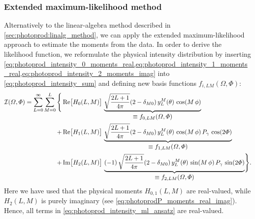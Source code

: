 \subsubsection{Extended maximum-likelihood method}%
\label{sec:photoprod:maximum_likelihood_method}

Alternatively to the linear-algebra method described in
\cref{sec:photoprod:linalg_method}, we can apply the extended
maximum-likelihood approach to estimate the moments from the data.  In
order to derive the likelihood function, we reformulate the physical
intensity distribution by inserting
\cref{eq:photoprod_intensity_0_moments_real,eq:photoprod_intensity_1_moments_real,eq:photoprod_intensity_2_moments_imag}
into \cref{eq:photoprod_intensity_sum} and defining new basis functions $f_{i, L M}(\Omega, \Phi)$:
\begin{align}
  \intensity(\Omega, \Phi)
  = \sum_{L = 0}^\infty \sum_{M = 0}^{L} \Bigg\{%
         &\Re[1]{H_0(L, M)}\, \dUnderbrace{       \sqrt{\frac{2 L + 1}{4 \pi}} (2 - \delta_{M 0})\, y_L^M(\theta)\, \cos(M\, \phi)}{\equiv f_{0, L M}(\Omega, \Phi)}
    \nonumber \\
    {} + &\Re[1]{H_1(L, M)}\, \dUnderbrace{       \sqrt{\frac{2 L + 1}{4 \pi}} (2 - \delta_{M 0})\, y_L^M(\theta)\, \cos(M\, \phi)\, P_\gamma\, \cos(2 \Phi)}{\equiv f_{1, L M}(\Omega, \Phi)}
    \nonumber \\
    \label{eq:photoprod_intensity_ml_ansatz}
    {} + &\Im[1]{H_2(L, M)}\, \dUnderbrace{(-1)\, \sqrt{\frac{2 L + 1}{4 \pi}} (2 - \delta_{M 0})\, y_L^M(\theta)\, \sin(M\, \phi)\, P_\gamma\, \sin(2 \Phi)}{\equiv f_{2, L M}(\Omega, \Phi)}
  \Bigg\}.
\end{align}
Here we have used that the physical moments $H_{0, 1}(L, M)$ are
real-valued, while $H_2(L, M)$ is purely imaginary (see
\cref{eq:photoprodP_moments_real_imag}).  Hence, all terms in
\cref{eq:photoprod_intensity_ml_ansatz} are real-valued.

